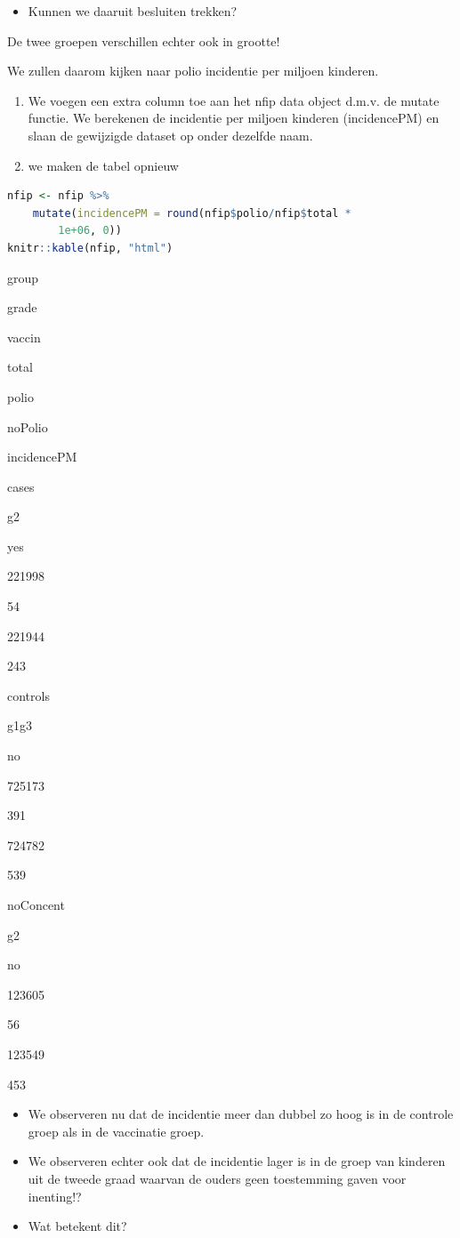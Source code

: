 \documentclass[
  12pt,dutch,coursenotes]{book}
\providecommand{\tightlist}{%
  \setlength{\itemsep}{0pt}\setlength{\parskip}{0pt}}
\theoremstyle{definition}
\theoremstyle{definition}
\theoremstyle{definition}
\theoremstyle{definition}
\theoremstyle{remark}
\begin{document}
\begin{itemize}
\tightlist
\item
  Kunnen we daaruit besluiten trekken?
\end{itemize}

De twee groepen verschillen echter ook in grootte!

We zullen daarom kijken naar polio incidentie per miljoen kinderen.

\begin{enumerate}
\def\labelenumi{\arabic{enumi}.}
\tightlist
\item
  We voegen een extra column toe aan het nfip data object d.m.v. de mutate functie. We berekenen de incidentie per miljoen kinderen (incidencePM) en slaan de gewijzigde dataset op onder dezelfde naam.
\item
  we maken de tabel opnieuw
\end{enumerate}

\begin{lstlisting}[language=R]
nfip <- nfip %>%
    mutate(incidencePM = round(nfip$polio/nfip$total *
        1e+06, 0))
knitr::kable(nfip, "html")
\end{lstlisting}

group

grade

vaccin

total

polio

noPolio

incidencePM

cases

g2

yes

221998

54

221944

243

controls

g1g3

no

725173

391

724782

539

noConcent

g2

no

123605

56

123549

453

\begin{itemize}
\item
  We observeren nu dat de incidentie meer dan dubbel zo hoog is in de controle groep als in de vaccinatie groep.
\item
  We observeren echter ook dat de incidentie lager is in de groep van kinderen uit de tweede graad waarvan de ouders geen toestemming gaven voor inenting!?
\item
  Wat betekent dit?
\end{itemize}
\end{document}
